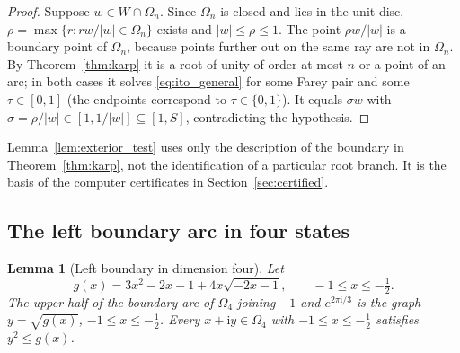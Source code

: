\documentclass[11pt,a4paper]{article}
\numberwithin{equation}{section}
\newtheorem{lemma}[theorem]{Lemma}
\theoremstyle{definition}
\theoremstyle{remark}
\newcommand{\ii}{\mathrm{i}}
\newcommand{\Om}{\Omega}
\begin{document}
\begin{proof}
Suppose \(w\in W\cap\Om_n\). Since \(\Om_n\) is closed and lies in the
unit disc, \(\rho=\max\{r:rw/|w|\in\Om_n\}\) exists and
\(|w|\le\rho\le1\). The point \(\rho w/|w|\) is a boundary point of
\(\Om_n\), because points further out on the same ray are not in
\(\Om_n\). By Theorem~\ref{thm:karp} it is a root of unity of order at
most \(n\) or a point of an arc; in both cases it solves
\eqref{eq:ito_general} for some Farey pair and some \(\tau\in[0,1]\)
(the endpoints correspond to \(\tau\in\{0,1\}\)). It equals
\(\sigma w\) with \(\sigma=\rho/|w|\in[1,1/|w|]\subseteq[1,S]\),
contradicting the hypothesis.
\end{proof}

Lemma~\ref{lem:exterior_test} uses only the description of the
boundary in Theorem~\ref{thm:karp}, not the identification of a
particular root branch. It is the basis of the computer certificates in
Section~\ref{sec:certified}.

\subsection{The left boundary arc in four states}

\begin{lemma}[Left boundary in dimension four]
\label{lem:boundary}
Let
\begin{equation}
g(x)=3x^2-2x-1+4x\sqrt{-2x-1},\qquad -1\le x\le-\tfrac12 .
\label{eq:g}
\end{equation}
The upper half of the boundary arc of \(\Om_4\) joining \(-1\) and
\(e^{2\pi\ii/3}\) is the graph \(y=\sqrt{g(x)}\),
\(-1\le x\le-\frac12\). Every \(x+\ii y\in\Om_4\) with
\(-1\le x\le-\frac12\) satisfies \(y^2\le g(x)\).
\end{lemma}
\end{document}
